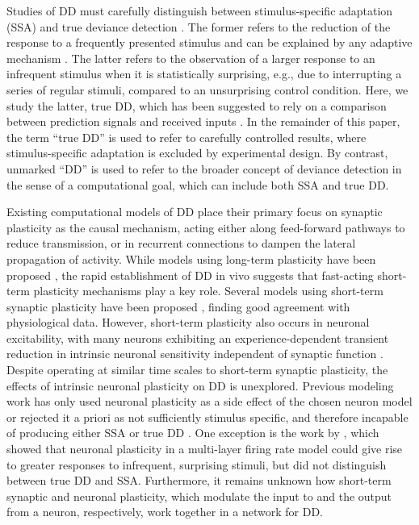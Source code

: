 \documentclass[9pt,lineno,onehalfspacing]{elife}
\begin{document}
Studies of DD must carefully distinguish between stimulus-specific adaptation (SSA) and true deviance detection \citep{Ross2020-qf}. The former refers to the reduction of the response to a frequently presented stimulus and can be explained by any adaptive mechanism \citep{May2010-qn, Garagnani2011-eu}. The latter refers to the observation of a larger response to an infrequent stimulus when it is statistically surprising, e.g., due to interrupting a series of regular stimuli, compared to an unsurprising control condition. Here, we study the latter, true DD, which has been suggested to rely on a comparison between prediction signals and received inputs \citep{Parras2017-fp, Carbajal2018-sd, Ross2020-qf}. In the remainder of this paper, the term ``true DD'' \citep{Ross2020-qf, Nelken2014-wr, Fishman2012-et} is used to refer to carefully controlled results, where stimulus-specific adaptation is excluded by experimental design. By contrast, unmarked ``DD'' is used to refer to the broader concept of deviance detection in the sense of a computational goal, which can include both SSA and true DD.

Existing computational models of DD place their primary focus on synaptic plasticity as the causal mechanism, acting either along feed-forward pathways to reduce transmission, or in recurrent connections to dampen the lateral propagation of activity. While models using long-term plasticity have been proposed \citep{Wacongne2012-ah, Hertag2020-kc}, the rapid establishment of DD in vivo \citep{Taaseh2011-gg} suggests that fast-acting short-term plasticity mechanisms play a key role. Several models using short-term synaptic plasticity have been proposed \citep{Mill2011-ah, May2015-lt, Yarden2017-eh}, finding good agreement with physiological data. However, short-term plasticity also occurs in neuronal excitability, with many neurons exhibiting an experience-dependent transient reduction in intrinsic neuronal sensitivity independent of synaptic function \citep{Sanchez-Vives2000-df, Henze2001-xd, Sanchez-Aguilera2014-fd}. Despite operating at similar time scales to short-term synaptic plasticity, the effects of intrinsic neuronal plasticity on DD is unexplored.  Previous modeling work has only used neuronal plasticity as a side effect of the chosen neuron model \citep{Mill2011-ah} or rejected it a priori as not sufficiently stimulus specific, and therefore incapable of producing either SSA or true DD \citep{Yarden2017-eh}. One exception is the work by \cite{Garagnani2011-eu}, which showed that neuronal plasticity in a multi-layer firing rate model could give rise to greater responses to infrequent, surprising stimuli, but did not distinguish between true DD and SSA. Furthermore, it remains unknown how short-term synaptic and neuronal plasticity, which modulate the input to and the output from a neuron, respectively, work together in a network for DD.
\end{document}
